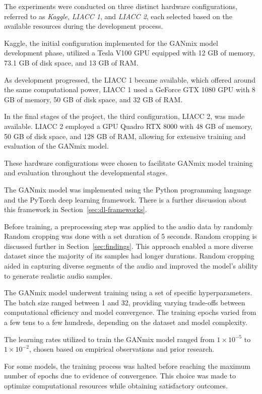 The experiments were conducted on three distinct hardware configurations, referred to as \textit{Kaggle}, \textit{\ac{LIACC} 1}, and \textit{\ac{LIACC} 2}, each selected based on the available resources during the development process.

Kaggle, the initial configuration implemented for the GANmix model development phase, utilized a Tesla V100 \ac{GPU} equipped with 12 \ac{GB} of memory, 73.1 \ac{GB} of disk space, and 13 \ac{GB} of \ac{RAM}.

As development progressed, the \ac{LIACC} 1 became available, which offered around the same computational power, \ac{LIACC} 1 used a GeForce GTX 1080 \ac{GPU} with 8 \ac{GB} of memory, 50 \ac{GB} of disk space, and 32 \ac{GB} of \ac{RAM}.

In the final stages of the project, the third configuration, \ac{LIACC} 2, was made available. \ac{LIACC} 2 employed a \ac{GPU} Quadro RTX 8000 with 48 \ac{GB} of memory, 50 \ac{GB} of disk space, and 128 \ac{GB} of \ac{RAM}, allowing for extensive training and evaluation of the GANmix model.

These hardware configurations were chosen to facilitate GANmix model training and evaluation throughout the developmental stages.

The GANmix model was implemented using the Python programming language and the PyTorch deep learning framework. There is a further discussion about this framework in Section~\ref{sec:dl-frameworks}.

Before training, a preprocessing step was applied to the audio data by randomly Random cropping was done with a set duration of 5 seconds. Random cropping is discussed further in Section~\ref{sec:findings}. This approach enabled a more diverse dataset since the majority of its samples had longer durations. Random cropping aided in capturing diverse segments of the audio and improved the model's ability to generate realistic audio samples.

The GANmix model underwent training using a set of specific hyperparameters. The batch size ranged between 1 and 32, providing varying trade-offs between computational efficiency and model convergence. The training epochs varied from a few tens to a few hundreds, depending on the dataset and model complexity. 

The learning rates utilized to train the GANmix model ranged from $1 \times 10^{-5}$ to $1 \times 10^{-2}$, chosen based on empirical observations and prior research.

For some models, the training process was halted before reaching the maximum number of epochs due to evidence of convergence. This choice was made to optimize computational resources while obtaining satisfactory outcomes.